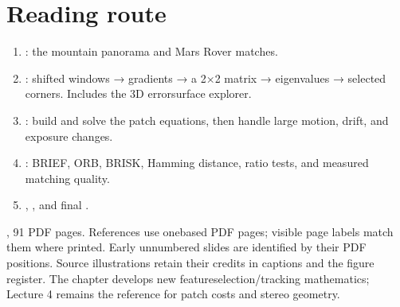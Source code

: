 \documentclass[letterpaper,11pt,english,openany,oneside]{jupyterBook}
\begin{document}
\section{Reading route}
\label{\detokenize{lectures/lecture05/index:reading-route}}\begin{enumerate}
%
\item {}
\sphinxAtStartPar
{\hyperref[\detokenize{lectures/lecture05/features::doc}]{}}: the mountain panorama and Mars Rover matches.

\item {}
\sphinxAtStartPar
{\hyperref[\detokenize{lectures/lecture05/corners::doc}]{}}: shifted windows → gradients → a 2×2 matrix → eigenvalues → selected corners. Includes the 3D error\sphinxhyphen{}surface explorer.

\item {}
\sphinxAtStartPar
{\hyperref[\detokenize{lectures/lecture05/tracking::doc}]{}}: build and solve the patch equations, then handle large motion, drift, and exposure changes.

\item {}
\sphinxAtStartPar
{\hyperref[\detokenize{lectures/lecture05/descriptors::doc}]{}}: BRIEF, ORB, BRISK, Hamming distance, ratio tests, and measured matching quality.

\item {}
\sphinxAtStartPar
{\hyperref[\detokenize{lectures/lecture05/quiz-workbook::doc}]{}}, {\hyperref[\detokenize{lectures/lecture05/review::doc}]{}}, and final {\hyperref[\detokenize{lectures/lecture05/tldr::doc}]{}}.

\end{enumerate}

\sphinxAtStartPar
{} , 91 PDF pages. References use one\sphinxhyphen{}based PDF pages; visible page labels match them where printed. Early unnumbered slides are identified by their PDF positions. Source illustrations retain their credits in captions and the figure register. The chapter develops new feature\sphinxhyphen{}selection/tracking mathematics; Lecture 4 remains the reference for patch costs and stereo geometry.
\end{document}
